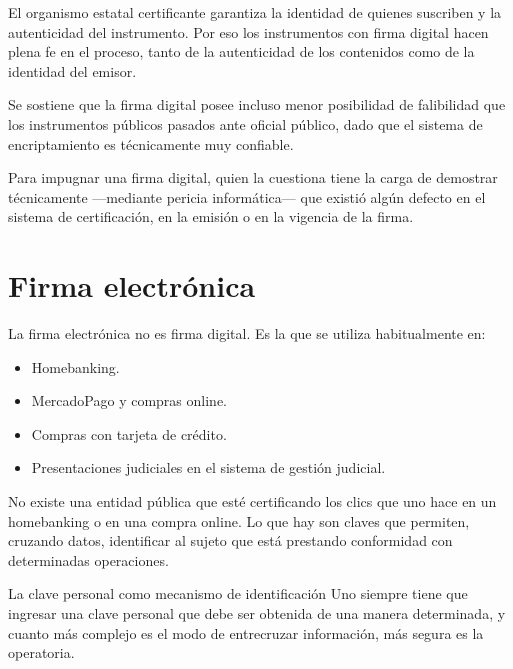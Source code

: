 \documentclass[12pt,oneside]{book}
\begin{document}
El organismo estatal certificante garantiza la identidad de quienes suscriben y la autenticidad del instrumento. Por eso los instrumentos con firma digital hacen plena fe en el proceso, tanto de la autenticidad de los contenidos como de la identidad del emisor.

Se sostiene que la firma digital posee incluso menor posibilidad de falibilidad que los instrumentos públicos pasados ante oficial público, dado que el sistema de encriptamiento es técnicamente muy confiable.

Para impugnar una firma digital, quien la cuestiona tiene la carga de demostrar técnicamente —mediante pericia informática— que existió algún defecto en el sistema de certificación, en la emisión o en la vigencia de la firma.

\section{Firma electrónica}

La firma electrónica no es firma digital. Es la que se utiliza habitualmente en:

\begin{itemize}
    \item Homebanking.
    \item MercadoPago y compras online.
    \item Compras con tarjeta de crédito.
    \item Presentaciones judiciales en el sistema de gestión judicial.
\end{itemize}

No existe una entidad pública que esté certificando los clics que uno hace en un homebanking o en una compra online. Lo que hay son claves que permiten, cruzando datos, identificar al sujeto que está prestando conformidad con determinadas operaciones.

\begin{example}{La clave personal como mecanismo de identificación}
Uno siempre tiene que ingresar una clave personal que debe ser obtenida de una manera determinada, y cuanto más complejo es el modo de entrecruzar información, más segura es la operatoria.
\end{example}
\end{document}
